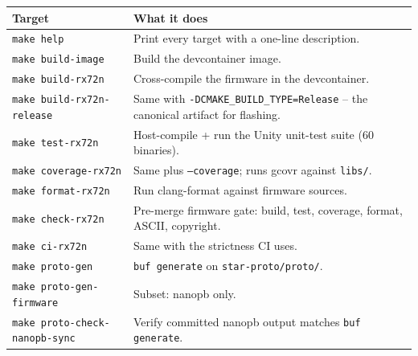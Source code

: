 \begin{center}
\begin{tabular}{|p{5.0cm}|p{9.5cm}|}
\hline
\textbf{Target}                         & \textbf{What it does}                                                                                              \\
\hline
\texttt{make help}                      & Print every target with a one-line description.                                                                    \\
\texttt{make build-image}               & Build the devcontainer image.                                                                                       \\
\texttt{make build-rx72n}               & Cross-compile the firmware in the devcontainer.                                                                     \\
\texttt{make build-rx72n-release}       & Same with \texttt{-DCMAKE\_BUILD\_TYPE=Release} -- the canonical artifact for flashing.                              \\
\texttt{make test-rx72n}                & Host-compile + run the Unity unit-test suite (60 binaries).                                                         \\
\texttt{make coverage-rx72n}            & Same plus \texttt{--coverage}; runs gcovr against \texttt{libs/}.                                                    \\
\texttt{make format-rx72n}              & Run clang-format against firmware sources.                                                                          \\
\texttt{make check-rx72n}               & Pre-merge firmware gate: build, test, coverage, format, ASCII, copyright.                                            \\
\texttt{make ci-rx72n}                  & Same with the strictness CI uses.                                                                                    \\
\texttt{make proto-gen}                 & \texttt{buf generate} on \texttt{star-proto/proto/}.                                                                 \\
\texttt{make proto-gen-firmware}        & Subset: nanopb only.                                                                                                 \\
\texttt{make proto-check-nanopb-sync}   & Verify committed nanopb output matches \texttt{buf generate}.                                                       \\

\end{tabular}
\end{center}
